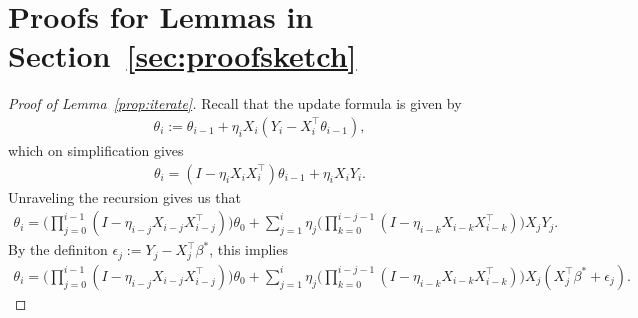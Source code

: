 \documentclass[11pt, reqno,english]{amsart}
\begin{document}
\section{Proofs for Lemmas in Section~\ref{sec:proofsketch}}

\begin{proof}[Proof of Lemma~\ref{prop:iterate}]
Recall that the update formula is given by
\begin{align*}
    \theta_{i}:= \theta_{i-1}+ \eta_{i}X_{i}(Y_{i}- X_{i}^\top\theta_{i-1}),
\end{align*}
which on simplification gives
\begin{align*}
    \theta_{i} = (I - \eta_i X_i X_i^\top)\theta_{i-1} + \eta_{i}X_iY_i.
\end{align*}
Unraveling the recursion gives us that
\begin{align*}
    \theta_i = \bigg(\prod_{j = 0}^{i-1}(I - \eta_{i-j}X_{i-j}X^\top_{i-j})\bigg)\theta_0 + \sum_{j = 1}^{i}\eta_j\bigg(\prod_{k = 0}^{i-j-1}(I - \eta_{i-k}X_{i-k}X_{i-k}^\top)\bigg)X_jY_j.
\end{align*}
By the definiton $\epsilon_j := Y_j - X^\top_j \beta^*$, this implies
\begin{align*}
       \theta_i = \bigg(\prod_{j = 0}^{i-1}(I - \eta_{i-j}X_{i-j}X^\top_{i-j})\bigg)\theta_0 + \sum_{j = 1}^{i}\eta_j\bigg(\prod_{k = 0}^{i-j-1}(I - \eta_{i-k}X_{i-k}X_{i-k}^\top)\bigg)X_j(X_j^\top \beta^* + \epsilon_j).
\end{align*}
\end{proof}
\end{document}
